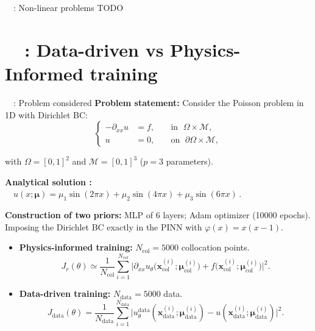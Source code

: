 
\begin{frame}{\appendixname~\theappendixframenumber~: Non-linear problems}
	TODO
\end{frame}
\addtocounter{appendixframenumber}{1}

\section{\appendixname~\theappendixframenumber~: Data-driven vs Physics-Informed training}

\begin{frame}{\appendixname~\theappendixframenumber~: Problem considered}
	\textbf{Problem statement:} Consider the Poisson problem in 1D with Dirichlet BC:
	\vspace{-5pt}
	\begin{equation*}
		\left\{
		\begin{aligned}
			-\partial_{xx} u & = f, \; &  & \text{in } \; \Omega \times \mathcal{M}, \\
			u         & = 0, \;  &  & \text{on } \; \partial\Omega \times \mathcal{M},
		\end{aligned}
		\right.
	\end{equation*}

	\vspace{-5pt}
	with $\Omega=[0,1]^2$ and $\mathcal{M}=[0,1]^3$ ($p=3$ parameters).
		
	\vspace{4pt}
	\textbf{Analytical solution :} $\quad u(x;\bm{\mu})=\mu_1\sin(2\pi x)+\mu_2\sin(4\pi x)+\mu_3\sin(6\pi x) \,.$

	\vspace{4pt}
	\textbf{Construction of two priors:} MLP of 6 layers; Adam optimizer (10000 epochs). \\
	Imposing the Dirichlet BC exactly in the PINN with $\varphi(x)=x(x-1)$.

	\begin{itemize}
		\item \textbf{Physics-informed training:} $N_\text{col}=5000$ collocation points.
		$$J_r(\theta) \simeq
			\frac{1}{N_\text{col}} \sum_{i=1}^{N_\text{col}} \big| \partial_{xx}u_\theta(\bm{x}_\text{col}^{(i)};\bm{\mu}_\text{col}^{(i)}\big) + f\big(\bm{x}_\text{col}^{(i)};\bm{\mu}_\text{col}^{(i)}\big) \big|^2.$$
	
		\item \textbf{Data-driven training:}  $N_\text{data}=5000$ data.
		$$J_\text{data}(\theta) =
		\frac{1}{N_\text{data}}
		\sum_{i=1}^{N_\text{data}} \big| u_\theta^\text{data}(\bm{x}_\text{data}^{(i)};\bm{\mu}_\text{data}^{(i)}) - u(\bm{x}_\text{data}^{(i)};\bm{\mu}_\text{data}^{(i)}) \big|^2.$$
	\end{itemize}
\end{frame}

